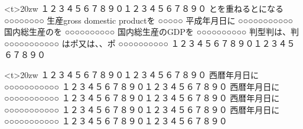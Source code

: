 \documentclass[a5paper,papersize]{jsarticle}
\begin{document}
\begin{minipage}<t>{20zw}
１２３４５６７８９０１２３４５６７８９０
とを重ねるとになる
○○○○○○○○\linebreak
生産gross domestic productを
○○○○○\linebreak
平成年月日に
○○○○○○○○○○○\linebreak
国内総生産のを
○○○○○○○○○○\linebreak
国内総生産のGDPを
○○○○○○○○○○\linebreak
判型判は、判
○○○○○○○○○○○\linebreak
はポ又は、、ポ
○○○○○○○○○○\linebreak
１２３４５６７８９０１２３４５６７８９０
\end{minipage}
\qquad
\begin{minipage}<t>{20zw}
\narrowbaselines
１２３４５６７８９０１２３４５６７８９０
西暦年月日に
○○○○○○○○○○○\linebreak
１２３４５６７８９０１２３４５６７８９０
西暦年月日に
○○○○○○○○○○○\linebreak
１２３４５６７８９０１２３４５６７８９０
%
西暦年月日に
○○○○○○○○○○○\linebreak
１２３４５６７８９０１２３４５６７８９０
%
西暦年月日に
○○○○○○○○○○○\linebreak
１２３４５６７８９０１２３４５６７８９０
\end{minipage}
\end{document}
